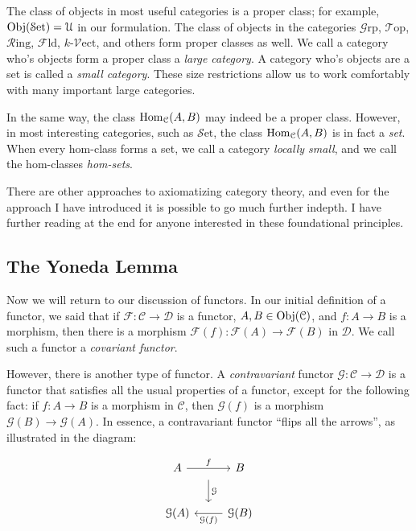 \documentclass[11pt, letterpaper]{article}
\newcommand{\Set}{\mathcal{S}\mathrm{et}}
\newcommand{\Grp}{\mathcal{G}\mathrm{rp}}
\newcommand{\Ring}{\mathcal{R}\mathrm{ing}}
\newcommand{\Top}{\mathcal{T}\mathrm{op}}
\newcommand{\Fld}{\mathcal{F}\mathrm{ld}}
\begin{document}
The class of objects in most useful categories is a proper class; for example, $\Obj(\Set ) =\mathcal{U} $ in our formulation. The class of objects in the categories $\Grp $, $\Top $, $\Ring $, $\Fld$, $k$-$\mathcal{V}\mathrm{ect} $, and others form proper classes as well. We call a category who's objects form a proper class a \emph{large category}. A category who's objects are a set is called a \emph{small category}. These size restrictions allow us to work comfortably with many important large categories.

In the same way, the class $\operatorname{Hom}_{\mathcal{C} }(A, B) $ may indeed be a proper class. However, in most interesting categories, such as $\Set $, the class $\operatorname{Hom}_{\mathcal{C} }(A, B) $ is in fact a \emph{set}. When every hom-class forms a set, we call a category \emph{locally small}, and we call the hom-classes \emph{hom-sets}.

There are other approaches to axiomatizing category theory, and even for the approach I have introduced it is possible to go much further indepth. I have further reading at the end for anyone interested in these foundational principles.

\subsection{The Yoneda Lemma}

Now we will return to our discussion of functors. In our initial definition of a functor, we said that if $\mathcal{F} : \mathcal{C}  \to \mathcal{D} $ is a functor, $A,B\in \operatorname{Obj}(\mathcal{C} ) $, and $f : A \to B$ is a morphism, then there is a morphism $\mathcal{F} (f): \mathcal{F} (A) \to \mathcal{F} (B)$ in $\mathcal{D} $. We call such a functor a \emph{covariant functor}.

However, there is another type of functor. A \emph{contravariant} functor $\mathcal{G} : \mathcal{C}  \to \mathcal{D} $ is a functor that satisfies all the usual properties of a functor, except for the following fact: if $f : A \to B$ is a morphism in $\mathcal{C} $, then $\mathcal{G} (f)$ is a morphism $\mathcal{G} (B)\to \mathcal{G} (A)$. In essence, a contravariant functor ``flips all the arrows'', as illustrated in the diagram:
\begin{diagram}[ht]
	\[\begin{tikzcd}[row sep = 2.5em, column sep = 2.5em]
		A\ar[r, "f"{name=f}]&B\\
		\mathcal{G} (A)&\mathcal{G} (B)\ar[l, "\mathcal{G} (f)"{name=gf}]
		\arrow[from=f, to=gf, "\mathcal{G} ", shorten=10pt]
	\end{tikzcd}\]
	\caption{Contravariant Functor}\label{dgm:6}
\end{diagram}
\end{document}
